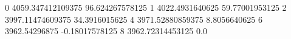 0 4059.347412109375 96.624267578125
1 4022.4931640625 59.77001953125
2 3997.11474609375 34.3916015625
4 3971.52880859375 8.8056640625
6 3962.54296875 -0.18017578125
8 3962.72314453125 0.0
